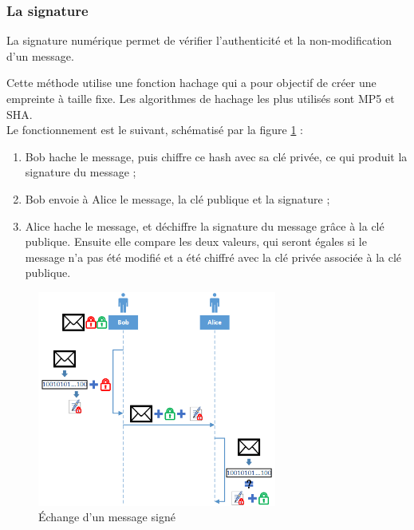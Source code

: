 
\subsubsection{La signature}
\label{La signature}

La signature numérique permet de vérifier l'authenticité et la non-modification d'un message.

Cette méthode utilise une fonction hachage qui a pour objectif de créer une empreinte à taille fixe.
Les algorithmes de hachage les plus utilisés sont MP5 et SHA.
\\

Le fonctionnement est le suivant, schématisé par la figure \ref{signature} :
\begin{enumerate}
	\item Bob hache le message, puis chiffre ce hash avec sa clé privée, ce qui produit la signature du message ;
	\item Bob envoie à Alice le message, la clé publique et la signature ;
	\item Alice hache le message, et déchiffre la signature du message grâce à la clé publique. Ensuite elle compare les deux valeurs, qui seront égales si le message n'a pas été modifié et a été chiffré avec la clé privée associée à la clé publique.
\end{enumerate}
\begin{figure}[!h]
	\center
	\includegraphics[width=0.7\textwidth]{img/signature.png}
	\caption{Échange d'un message signé}
	\label{signature}
\end{figure}


